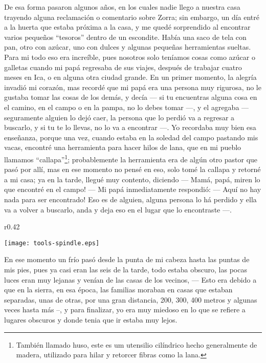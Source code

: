 De esa forma pasaron algunos años, en los cuales nadie llego a nuestra casa trayendo alguna reclamación o comentario sobre Zorra; sin embargo, un día entré a la huerta que estaba próxima a la casa, y me quedé sorprendido al encontrar varios pequeños ``tesoros'' dentro de un escondite. Había una saco de tela con pan, otro con azúcar, uno con dulces y algunas pequeñas herramientas sueltas.
Para mi todo eso era increíble, pues nosotros solo teníamos cosas como azúcar o galletas cuando mi papá regresaba de sus viajes, después de trabajar cuatro meses en Ica, o en alguna otra ciudad grande. 
En un primer momento, la alegría invadió mi corazón, mas recordé que mi papá era una persona muy rigurosa, no le gustaba tomar las cosas de los demás, y decía --- si tu encuentras alguna cosa en el camino, en el campo o en la pampa, no lo debes tomar ---, y el agregaba --- seguramente alguien lo dejó caer, la persona que lo perdió va a regresar a buscarlo, y si tu te lo llevas, no lo va a encontrar ---.
Yo recordaba muy bien esa enseñanza, porque una vez, cuando estaba en la soledad del campo pastando mis vacas, encontré una herramienta para hacer hilos de lana, que en mi pueblo llamamos ``callapa''\footnote{También llamado huso, este es um utensilio cilíndrico hecho generalmente de madera, utilizado para hilar y retorcer fibras como la lana.}; probablemente la herramienta era de algún otro pastor que pasó por allí, mas en ese momento no pensé en eso, solo tomé la callapa y retorné a mi casa; ya en la tarde, llegué muy contento, diciendo --- Mamá, papá, miren lo que encontré en el campo! ---
Mi papá inmediatamente respondió:  --- Aquí no hay nada para ser encontrado! Eso es de alguien, alguna persona lo há perdido y ella va a volver a buscarlo, anda y deja eso en el lugar que lo encontraste ---.


\begin{wrapfigure}{r}{0.42\textwidth}
  \begin{center}
  \vspace{-10pt}
    \texttt{[image: tools-spindle.eps]}
  \end{center}
  \vspace{-20pt}
\end{wrapfigure}
En ese momento un frío pasó desde la punta de mi cabeza hasta las puntas de mis pies, pues ya casi eran las seis de la tarde, todo estaba obscuro, las pocas luces eran muy lejanas y venían de las casas de los vecinos, --- Esto era debido a que en la sierra, en esa época, las familias moraban en casas que estaban separadas, unas de otras, por una gran distancia, 200, 300, 400 metros y algunas veces hasta más --, y para finalizar, yo era muy miedoso en lo que se refiere a lugares obscuros y donde tenia que ir estaba muy lejos.

